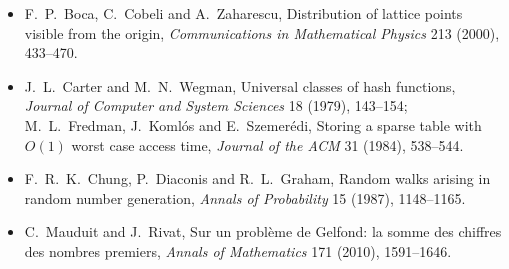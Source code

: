 \begin{itemize}
fractions).
\item F.~P.~Boca, C.~Cobeli and A.~Zaharescu, Distribution of lattice points visible from the origin, \emph{Communications in
Mathematical Physics} 213 (2000), 433--470.
\item J.~L.~Carter and M.~N.~Wegman, Universal classes of hash functions, \emph{Journal of Computer and System Sciences} 18 (1979),
143--154; M.~L.~Fredman, J.~Komlós and E.~Szemerédi, Storing a sparse table with $O(1)$ worst case access time, \emph{Journal of the
ACM} 31 (1984), 538--544.
\item F.~R.~K.~Chung, P.~Diaconis and R.~L.~Graham, Random walks arising in random number generation, \emph{Annals of Probability} 15
(1987), 1148--1165.
\item C.~Mauduit and J.~Rivat, Sur un problème de Gelfond: la somme des chiffres des nombres premiers, \emph{Annals of Mathematics}
171 (2010), 1591--1646.
\end{itemize}
